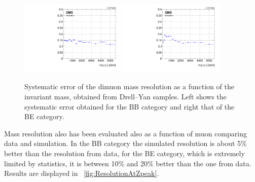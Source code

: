 \begin{figure}[htbp]
\centering
\includegraphics[width=0.45\textwidth]{Images/Cap5/ResSystVsMass_BB.pdf}
\includegraphics[width=0.45\textwidth]{Images/Cap5/ResSystVsMass_BE.pdf}
\caption{Systematic error of the dimuon mass resolution as a function of the invariant mass, obtained from Drell--Yan samples. Left shows the systematic error obtained for the BB category and right that of the BE category. }
\label{fig:ResolutionSystematic}
\end{figure}

Mass resolution also has been evaluated also as a function of muon \pt comparing data and simulation. In the BB category the simulated resolution is about 5\% better than the resolution from data, for the BE category, which is extremely limited by statistics, it is between 10\% and 20\% better than the one from data. Results are displayed in \figurename~\ref{fig:ResolutionAtZpeak}. 

